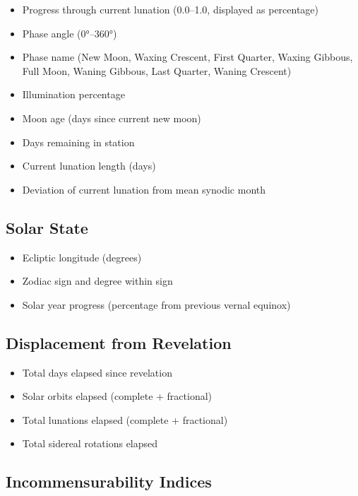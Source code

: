 \begin{itemize}
\tightlist
\item
  Progress through current lunation (0.0--1.0, displayed as percentage)
\item
  Phase angle (0°--360°)
\item
  Phase name (New Moon, Waxing Crescent, First Quarter, Waxing Gibbous, Full Moon, Waning Gibbous, Last Quarter, Waning Crescent)
\item
  Illumination percentage
\item
  Moon age (days since current new moon)
\item
  Days remaining in station
\item
  Current lunation length (days)
\item
  Deviation of current lunation from mean synodic month
\end{itemize}

\hypertarget{solar-state}{%
\subsection{Solar State}\label{solar-state}}

\begin{itemize}
\tightlist
\item
  Ecliptic longitude (degrees)
\item
  Zodiac sign and degree within sign
\item
  Solar year progress (percentage from previous vernal equinox)
\end{itemize}

\hypertarget{displacement-from-revelation}{%
\subsection{Displacement from Revelation}\label{displacement-from-revelation}}

\begin{itemize}
\tightlist
\item
  Total days elapsed since revelation
\item
  Solar orbits elapsed (complete + fractional)
\item
  Total lunations elapsed (complete + fractional)
\item
  Total sidereal rotations elapsed
\end{itemize}

\hypertarget{incommensurability-indices}{%
\subsection{Incommensurability Indices}\label{incommensurability-indices}}

